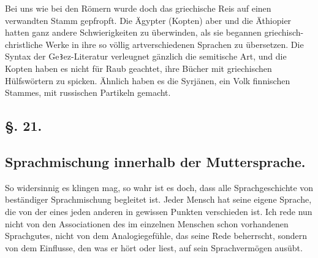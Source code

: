 {Bei uns wie bei den Römern wurde doch das griechische Reis auf einen verwandten Stamm gepfropft. Die Ägypter (Kopten) aber und die Äthiopier hatten ganz andere Schwierigkeiten zu überwinden, als sie begannen griechisch-christliche Werke in ihre so völlig artverschiedenen Sprachen zu übersetzen. Die Syntax der Ge\texttt{Ꜣ}ez-Literatur verleugnet gänzlich die semitische Art, und die Kopten haben es nicht für Raub geachtet, ihre Bücher mit griechischen Hülfs\-\label{sp.273}wört\-ern zu spicken. Ähnlich haben es die Syrjänen, ein Volk finnischen Stammes, mit russischen Partikeln gemacht. 

\label{fp.267}

\subsection*{§. 21.}\label{III.II.II.21}
\subsection*{Sprachmischung innerhalb der Muttersprache.}
So widersinnig es klingen mag, so wahr ist es doch, dass alle Sprachgeschichte von beständiger Sprachmischung begleitet ist. Jeder Mensch hat seine eigene Sprache, die von der eines jeden anderen in gewissen Punkten verschieden ist. Ich rede nun nicht von den Associationen des im einzelnen Menschen schon vorhandenen Sprachgutes, nicht von dem Analogiegefühle, das seine Rede beherrscht, sondern von dem Einflusse, den  was er hört oder liest, auf sein Sprachvermögen ausübt.

}
